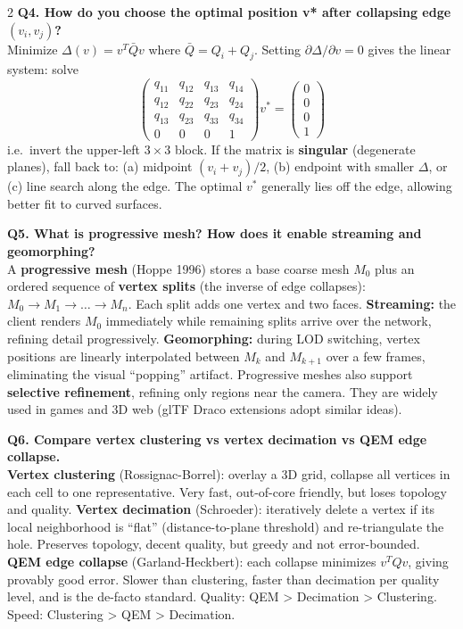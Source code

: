\begin{paracol}{2}
\textbf{Q4. How do you choose the optimal position v* after collapsing edge $(v_i,v_j)$?}\\
Minimize $\Delta(v)=v^T \bar Q v$ where $\bar Q = Q_i + Q_j$. Setting $\partial \Delta / \partial v = 0$ gives the linear system: solve
\[
\begin{pmatrix} q_{11} & q_{12} & q_{13} & q_{14}\\ q_{12} & q_{22} & q_{23} & q_{24}\\ q_{13} & q_{23} & q_{33} & q_{34}\\ 0 & 0 & 0 & 1 \end{pmatrix} v^* = \begin{pmatrix} 0\\0\\0\\1 \end{pmatrix}
\]
i.e.\ invert the upper-left $3\times 3$ block. If the matrix is \textbf{singular} (degenerate planes), fall back to: (a) midpoint $(v_i+v_j)/2$, (b) endpoint with smaller $\Delta$, or (c) line search along the edge. The optimal $v^*$ generally lies off the edge, allowing better fit to curved surfaces.

\textbf{Q5. What is progressive mesh? How does it enable streaming and geomorphing?}\\
A \textbf{progressive mesh} (Hoppe 1996) stores a base coarse mesh $M_0$ plus an ordered sequence of \textbf{vertex splits} (the inverse of edge collapses): $M_0 \to M_1 \to \ldots \to M_n$. Each split adds one vertex and two faces. \textbf{Streaming:} the client renders $M_0$ immediately while remaining splits arrive over the network, refining detail progressively. \textbf{Geomorphing:} during LOD switching, vertex positions are linearly interpolated between $M_k$ and $M_{k+1}$ over a few frames, eliminating the visual ``popping'' artifact. Progressive meshes also support \textbf{selective refinement}, refining only regions near the camera. They are widely used in games and 3D web (glTF Draco extensions adopt similar ideas).

\textbf{Q6. Compare vertex clustering vs vertex decimation vs QEM edge collapse.}\\
\textbf{Vertex clustering} (Rossignac-Borrel): overlay a 3D grid, collapse all vertices in each cell to one representative. Very fast, out-of-core friendly, but loses topology and quality. \textbf{Vertex decimation} (Schroeder): iteratively delete a vertex if its local neighborhood is ``flat'' (distance-to-plane threshold) and re-triangulate the hole. Preserves topology, decent quality, but greedy and not error-bounded. \textbf{QEM edge collapse} (Garland-Heckbert): each collapse minimizes $v^T Q v$, giving provably good error. Slower than clustering, faster than decimation per quality level, and is the de-facto standard. Quality: QEM > Decimation > Clustering. Speed: Clustering > QEM > Decimation.


\end{paracol}
